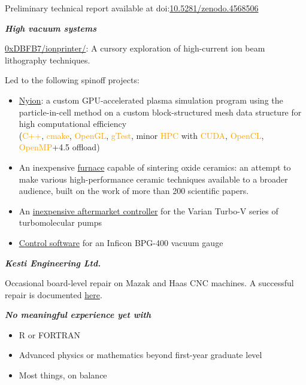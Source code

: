 \documentclass[fleqn,11pt]{article}
\newcommand{\ressection}[1]{\textbf{{\Large \textit{#1}}}\xrfill[0.1ex]{0.6pt}}
\newcommand{\sk}[1]{\textcolor{orange}{#1}}
\newcommand{\itemoptions}{\setlength{\itemindent}{-10pt} \setlength\itemsep{-1em}}
\begin{document}
Preliminary technical report available at doi:\href{https://doi.org/10.5281/zenodo.4568506}{10.5281/zenodo.4568506}

\pagebreak

\ressection{High vacuum systems}

\href{https://github.com/0xDBFB7/ionprinter/}{0xDBFB7/ionprinter/}: A cursory exploration of high-current ion beam lithography techniques. 

Led to the following spinoff projects:
\begin{itemize}\itemoptions
	\item \href{https://github.com/0xDBFB7/Nyion}{Nyion}: a custom GPU-accelerated plasma simulation program using the particle-in-cell method on a custom block-structured mesh data structure for high computational efficiency\\
	(\sk{C++}, \sk{cmake}, \sk{OpenGL}, \sk{gTest}, minor \sk{HPC} with \sk{CUDA}, \sk{OpenCL}, \sk{OpenMP}+4.5 offload)
	\item An inexpensive \href{https://0xdbfb7.com/furnace.html}{furnace} capable of sintering oxide ceramics: an attempt to make various high-performance ceramic techniques available to a broader audience, built on the work of more than 200 scientific papers. 
	\item An \href{https://github.com/0xDBFB7/varian-turbo-controller}{inexpensive aftermarket controller} for the Varian Turbo-V series of turbomolecular pumps 
	\item \href{https://gist.github.com/0xDBFB7/7bd7048c6639270e6f291a2673903184}{Control software} for an Inficon BPG-400 vacuum gauge
\end{itemize}




\ressection{Kesti Engineering Ltd.}

Occasional board-level repair on Mazak and Haas CNC machines. A successful repair is documented \href{https://0xdbfb7.com/meldas.html}{here}.

\ressection{No meaningful experience yet with}

\begin{itemize}\itemoptions
	\item R or FORTRAN
	\item Advanced physics or mathematics beyond first-year graduate level
	\item Most things, on balance
\end{itemize}


\light{\makebox[\linewidth]{\rule{\textwidth}{0.4pt}}}
\end{document}
